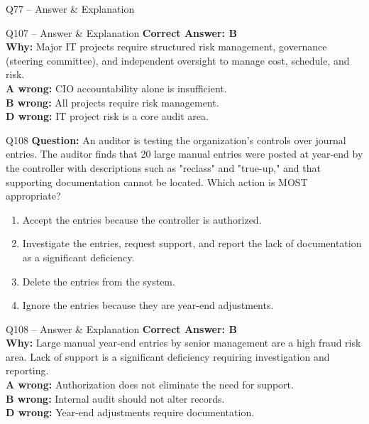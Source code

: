 \documentclass[aspectratio=169,10pt]{beamer}
\begin{document}
\begin{frame}[t]{Q77 -- Answer \& Explanation}
	\begin{frame}[t]{Q107 -- Answer \& Explanation}
		\small
		\textbf{Correct Answer: B} \\[4pt]
		\textbf{Why:} Major IT projects require structured risk management, governance (steering committee), and independent oversight to manage cost, schedule, and risk. \\[4pt]
		\textbf{A wrong:} CIO accountability alone is insufficient. \\[2pt]
		\textbf{B wrong:} All projects require risk management. \\[2pt]
		\textbf{D wrong:} IT project risk is a core audit area.
	\end{frame}
	
	\begin{frame}[t]{Q108}
		\small
		\textbf{Question:} An auditor is testing the organization's controls over journal entries. The auditor finds that 20 large manual entries were posted at year-end by the controller with descriptions such as "reclass" and "true-up," and that supporting documentation cannot be located. Which action is MOST appropriate?
		\begin{enumerate}[label=\Alph*.,itemsep=1pt,topsep=2pt]
			\item Accept the entries because the controller is authorized.
			\item Investigate the entries, request support, and report the lack of documentation as a significant deficiency.
			\item Delete the entries from the system.
			\item Ignore the entries because they are year-end adjustments.
		\end{enumerate}
	\end{frame}
	
	\begin{frame}[t]{Q108 -- Answer \& Explanation}
		\small
		\textbf{Correct Answer: B} \\[4pt]
		\textbf{Why:} Large manual year-end entries by senior management are a high fraud risk area. Lack of support is a significant deficiency requiring investigation and reporting. \\[4pt]
		\textbf{A wrong:} Authorization does not eliminate the need for support. \\[2pt]
		\textbf{B wrong:} Internal audit should not alter records. \\[2pt]
		\textbf{D wrong:} Year-end adjustments require documentation.
	\end{frame}
	

\end{frame}
\end{document}
